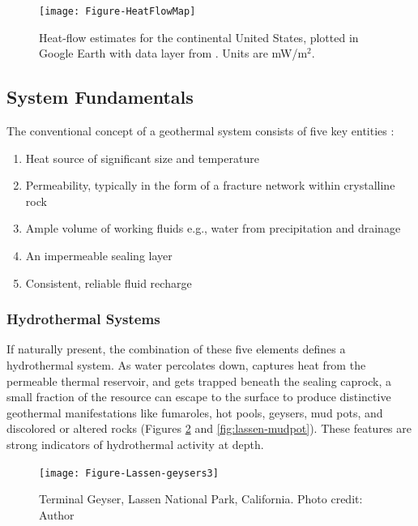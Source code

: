\begin{figure}
\centering
\texttt{[image: Figure-HeatFlowMap]}
\caption[Heat flow across the continental U.S.]{Heat-flow estimates for the continental United States, plotted in Google Earth with data layer from \protect\citep{lucazeau_analysis_2019}. Units are mW/m$^2$.}
\label{fig:heatflow}
\end{figure}
\vfill
\subsection{System Fundamentals}\label{ch2:sysfund}

The conventional concept of a geothermal system consists of five key entities \citep[p.\ 9]{dipippo_geothermal_2012}:
\begin{enumerate}[itemsep=2pt] \label{list:sysreq}
   \renewcommand{\labelenumi}{\roman{enumi}}
   \item Heat source of significant size and temperature
   \item Permeability, typically in the form of a fracture network within crystalline rock
   \item Ample volume of working fluids e.g., water from precipitation and drainage
   \item An impermeable sealing layer
   \item Consistent, reliable fluid recharge
\end{enumerate}

\subsubsection{Hydrothermal Systems}\label{ch2:hydro}

If naturally present, the combination of these five elements defines a hydrothermal system. As water percolates down, captures heat from the permeable thermal reservoir, and gets trapped beneath the sealing caprock, a small fraction of the resource can escape to the surface to produce distinctive geothermal manifestations like fumaroles, hot pools, geysers, mud pots, and discolored or altered rocks (Figures \ref{fig:lassen-geysers} and \ref{fig:lassen-mudpot}). These features are strong indicators of hydrothermal activity at depth.

\begin{figure}
\centering
\texttt{[image: Figure-Lassen-geysers3]}
\caption[Terminal Geyser, Lassen National Park]{Terminal Geyser, Lassen National Park, California. Photo credit: Author}
\label{fig:lassen-geysers}
\end{figure}

